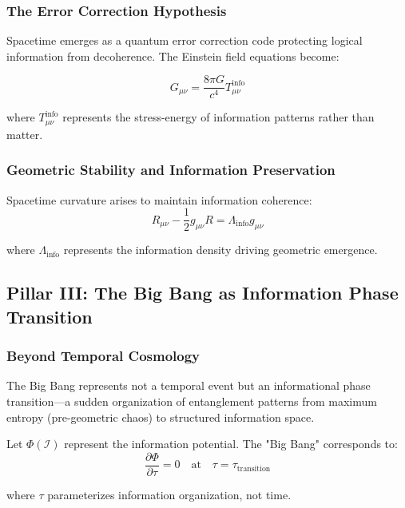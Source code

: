 \documentclass[12pt]{article}
\begin{document}
\subsubsection{The Error Correction Hypothesis}

Spacetime emerges as a quantum error correction code protecting logical information from decoherence. The Einstein field equations become:

\begin{equation}
G_{\mu\nu} = \frac{8\pi G}{c^4} T_{\mu\nu}^{\text{info}}
\end{equation}

where $T_{\mu\nu}^{\text{info}}$ represents the stress-energy of information patterns rather than matter.

\subsubsection{Geometric Stability and Information Preservation}

Spacetime curvature arises to maintain information coherence:
\begin{equation}
R_{\mu\nu} - \frac{1}{2}g_{\mu\nu}R = \Lambda_{\text{info}} g_{\mu\nu}
\end{equation}

where $\Lambda_{\text{info}}$ represents the information density driving geometric emergence.

\subsection{Pillar III: The Big Bang as Information Phase Transition}

\subsubsection{Beyond Temporal Cosmology}

The Big Bang represents not a temporal event but an informational phase transition—a sudden organization of entanglement patterns from maximum entropy (pre-geometric chaos) to structured information space.

Let $\Phi(\mathcal{I})$ represent the information potential. The "Big Bang" corresponds to:
\begin{equation}
\frac{\partial \Phi}{\partial \tau} = 0 \quad \text{at} \quad \tau = \tau_{\text{transition}}
\end{equation}

where $\tau$ parameterizes information organization, not time.
\end{document}
